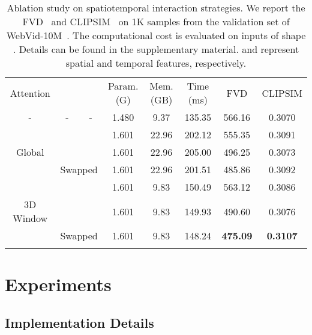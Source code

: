 \documentclass{article}
\begin{document}
\begin{table}[t]
    \centering
    \footnotesize
    \caption{Ablation study on spatiotemporal interaction strategies. We report the FVD~\cite{FVD} and CLIPSIM~\cite{CLIP} on 1K samples from the validation set of WebVid-10M~\cite{bain2021frozen}. The computational cost is evaluated on inputs of shape . Details can be found in the supplementary material.  and  represent spatial and temporal features, respectively.
    }
    \vspace{1mm}
    \renewcommand{\arraystretch}{1.2}
    \begin{tabular}{c|c|c|ccccc}
        \Xhline{1.2pt}
         Attention   &  &  & Param. (G) & Mem. (GB) & Time (ms) &  FVD  & CLIPSIM  \\
        \Xhline{0.4pt}
         -                  & -    &   -  & 1.480 & 9.37  & 135.35 & 566.16  & 0.3070 \\ \Xhline{0.4pt}
                            &  &   & 1.601 & 22.96 & 202.12 & 555.35 & 0.3091 \\ Global              &  &   & 1.601 & 22.96 & 205.00 & 496.25 & 0.3073 \\
        \cline{2-8}
                            & \multicolumn{2}{c|}{Swapped}  & 1.601 & 22.96 & 201.51 & 485.86 & 0.3092 \\
           
        \Xhline{0.4pt}
                            &  &   & 1.601 & 9.83 & 150.49 & 563.12 & 0.3086 \\ 3D Window           &  &    & 1.601 & 9.83 & 149.93 & 490.60 & 0.3076 \\
        \cline{2-8}
                            & \multicolumn{2}{c|}{Swapped}  & 1.601 & 9.83 & 148.24 & \textbf{475.09} & \textbf{0.3107} \\
        \Xhline{1.2pt}
    \end{tabular}
    \label{tab:aba_interaction}
\end{table}

\section{Experiments}

\subsection{Implementation Details}
\end{document}
